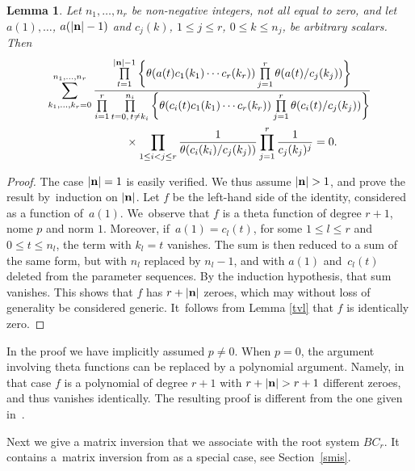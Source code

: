 \documentclass[pdftex]{sigma}%
\numberwithin{equation}{section}
\newtheorem{Lemma}[Theorem]{Lemma}
 { \theoremstyle{definition}
\newtheorem{Definition}[Theorem]{Definition}
\newtheorem{Remark}[Theorem]{Remark} }
\begin{document}
\begin{Lemma}\label{afg}
Let $n_1,\dots,n_r$ be non-negative integers, not all equal to zero,
and let $a(1),\dots$, $a({|{\bf n}|-1})$ and
$c_j(k)$, $1\leq j\leq r$, $0\leq k\leq n_j$, be arbitrary scalars.
Then
\begin{gather*}
\sum_{k_1,\dots,k_r=0}^{n_1,\dots,n_r}\frac{\prod\limits_{t=1}^{|{\bf n}|-1}\bigg\{
\theta(a(t)c_1(k_1)\dotsm
c_r(k_r))\prod\limits_{j=1}^r\theta(a(t)/c_j(k_j))\bigg\}}
{\prod\limits_{i=1}^r\prod\limits_{t=0,\,t\neq k_i}^{n_i}\bigg\{\theta(c_i(t)c_1(k_1)\dotsm
c_r(k_r))\prod\limits_{j=1}^r\theta(c_i(t)/c_j(k_j))\bigg\}}
\\ \phantom{\sum_{k_1,\dots,k_r=0}^{n_1,\dots,n_r}}{}
\times\prod\limits_{1\leq i<j\leq r}\frac{1}{\theta(c_i(k_i)/c_j(k_j))}
\prod\limits_{j=1}^r\frac{1}{c_j(k_j)^j}=0.
\end{gather*}
\end{Lemma}

\begin{proof}
The case $|{\bf n}|=1$ is easily verified. We thus assume
$|{\bf n}|>1$, and prove the result by~induction on $|{\bf n}|$.
Let $f$ be the left-hand
side of the identity, considered as a function of~$a(1)$. We~observe that $f$
 is a theta function of
degree $r+1$, nome $p$ and norm $1$. Moreover, if~\mbox{$a(1)=c_l(t)$}, for some $1\leq l\leq r$ and $0\leq
t\leq n_l$, the term with $k_l=t$ vanishes. The sum is then
reduced to a sum of the same form, but with $n_l$ replaced by $n_l-1$,
and with $a(1)$ and~$c_l(t)$ deleted from the parameter sequences. By
the induction hypothesis, that sum vanishes. This shows that
$f$ has $r+|{\bf n}|$ zeroes, which may without loss of generality be considered generic. It~follows from Lemma \ref{tvl} that $f$ is
 identically
zero.
\end{proof}

\begin{Remark} In the proof we have implicitly assumed $p\neq 0$. When $p=0$, the argument involving theta functions can
be replaced by a polynomial argument. Namely,
in that case $f$ is a polynomial of degree $r+1$ with $r+|{\bf
n}|>r+1$ different zeroes, and thus vanishes identically. The resulting proof
is different from the one given in~\cite{s}.
\end{Remark}

Next we give a matrix inversion that we associate with the root system $BC_r$. It contains a~matrix inversion from \cite{bs} as a special case, see Section~\ref{smis}.
\end{document}
